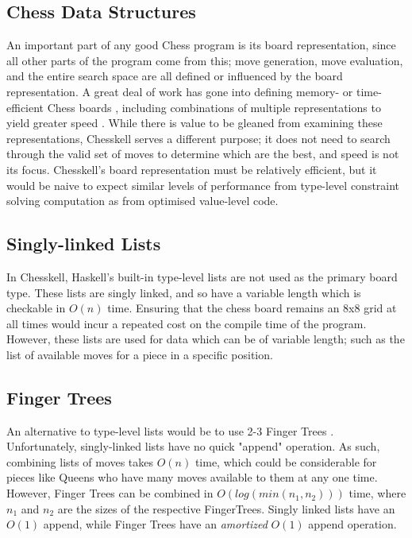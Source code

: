 \documentclass[12pt, a4paper, bibliography=totocnumbered]{scrreprt}
\begin{document}
\subsection{Chess Data Structures}

An important part of any good Chess program is its board representation, since all other parts of the program come from this; move generation, move evaluation, and the entire search space are all defined or influenced by the board representation. A great deal of work has gone into defining memory- or time-efficient Chess boards \cite{bitboard} \cite{searchtables}, including combinations of multiple representations to yield greater speed \cite{bitandccr}. While there is value to be gleaned from examining these representations, Chesskell serves a different purpose; it does not need to search through the valid set of moves to determine which are the best, and speed is not its focus. Chesskell's board representation must be relatively efficient, but it would be naive to expect similar levels of performance from type-level constraint solving computation as from optimised value-level code.

\subsection{Singly-linked Lists}

In Chesskell, Haskell's built-in type-level lists are not used as the primary board type. These lists are singly linked, and so have a variable length which is checkable in $O(n)$ time. Ensuring that the chess board remains an 8x8 grid at all times would incur a repeated cost on the compile time of the program. However, these lists are used for data which can be of variable length; such as the list of available moves for a piece in a specific position.

\subsection{Finger Trees}

An alternative to type-level lists would be to use 2-3 Finger Trees \cite{fingertrees}. Unfortunately, singly-linked lists have no quick "append" operation. As such, combining lists of moves takes $O(n)$ time, which could be considerable for pieces like Queens who have many moves available to them at any one time. However, Finger Trees can be combined in $O(log(min(n_{1}, n_{2})))$ time, where $n_{1}$ and $n_{2}$ are the sizes of the respective FingerTrees. Singly linked lists have an $O(1)$ append, while Finger Trees have an \emph{amortized} $O(1)$ append operation.
\end{document}
